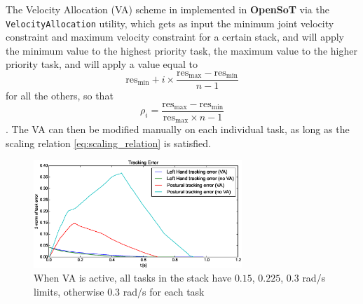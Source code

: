 The Velocity Allocation (VA) scheme in implemented in \textbf{OpenSoT} via the \texttt{VelocityAllocation} utility, which gets as input the minimum joint velocity constraint and maximum velocity constraint for a certain stack, and will apply the minimum value to the highest priority task, the maximum value to the higher priority task, and will apply a value equal to 
\begin{equation}
\text{res}_\text{min} + i \times \frac{\text{res}_\text{max} - \text{res}_\text{min}}{n-1}
\end{equation} for all the others, so that 
\begin{equation}
\rho_i=\frac{\text{res}_\text{max} - \text{res}_\text{min}}{\text{res}_\text{max} \times n-1}
\end{equation}. The VA can then be modified manually on each individual task, as long as the scaling relation \ref{eq:scaling_relation} is satisfied.


\begin{figure}[!h]
\vspace{2 mm}
\centering
\includegraphics[width=0.7\textwidth]{images/sim_data/postural_vel_alloc}
\caption{When VA is active, all tasks in the stack have $0.15$, $0.225$, $0.3$ rad/s limits, otherwise $0.3$ rad/s for each task}
\label{fig:velocity_allocation}
\end{figure}


